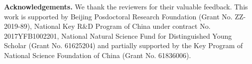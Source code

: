 \documentclass[10pt,twocolumn,letterpaper]{article}
\begin{document}
\small
\vspace{2mm}
\textbf{Acknowledgements.} We thank the reviewers for their valuable feedback. This work is supported by Beijing Posdoctoral Research Foundation (Grant No. ZZ-2019-89), National Key R\&D Program of China under contract No. 2017YFB1002201, National Natural Science Fund for Distinguished Young Scholar (Grant No. 61625204) and partially supported by the Key Program of National Science Foundation of China (Grant No. 61836006). 

{\small


}
\end{document}
